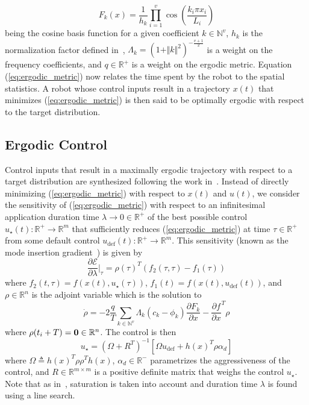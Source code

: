 \documentclass[conference]{IEEEtran}
\begin{document}
\begin{equation*}
F_k(x) = \frac{1}{h_k}\prod_{i=1}^v \cos \left( \frac{k_i \pi x_i}{L_i} \right)
\end{equation*}
being the cosine basis function for a given coefficient $k \in \mathbb{N}^v$,  $h_k$ is the normalization factor defined in~\cite{mathew2011metrics}, $\Lambda_k = (1 + \Vert k \Vert^2)^{-\frac{v+1}{2}}$ is a weight on the frequency coefficients, and $q\in \mathbb{R}^+$ is a weight on the ergodic metric.
Equation (\ref{eq:ergodic_metric}) now relates the time spent by the robot to the spatial statistics.
A robot whose control inputs result in a trajectory $x(t)$ that minimizes (\ref{eq:ergodic_metric}) is then said to be optimally ergodic with respect to the target distribution.

\subsection{Ergodic Control}

Control inputs that result in a maximally ergodic trajectory with respect to a target distribution are synthesized following the work in~\cite{mavrommati2017eSAC}.
Instead of directly minimizing (\ref{eq:ergodic_metric}) with respect to $x(t)$ and $u(t)$, we consider the sensitivity of (\ref{eq:ergodic_metric}) with respect to an infinitesimal application duration time $\lambda \to 0 \in \mathbb{R}^+$ of the best possible control $u_\star(t) : \mathbb{R}^+ \to \mathbb{R}^m$ that sufficiently reduces (\ref{eq:ergodic_metric}) at time $\tau \in \mathbb{R}^+$ from some default control $u_\text{def}(t) : \mathbb{R}^+ \to \mathbb{R}^m$.
This sensitivity (known as the mode insertion gradient~\cite{vasudevan2013consistent, axelsson2008gradient, egerstedt2006transition, caldwell2016projection}) is given by
\begin{equation*}
\frac{\partial \mathcal{E}}{\partial \lambda} \Big \vert_\tau = \rho(\tau)^T (f_2(\tau, \tau) - f_1(\tau))
\end{equation*}
where $f_2(t, \tau) = f(x(t), u_\star(\tau))$, $f_1(t) = f(x(t), u_\text{def}(t))$, and $\rho \in \mathbb{R}^n$ is the adjoint variable which is the solution to
\begin{equation*}
\dot{\rho} = - 2 \frac{q}{T} \sum_{k \in \mathbb{N}^v} \Lambda_k (c_k - \phi_k) \frac{\partial F_k}{\partial x} - \frac{\partial f}{\partial x}^T \rho
\end{equation*}
where $\rho(t_i + T) = \bold{0} \in \mathbb{R}^n$.
The control is then
\begin{equation}
u_\star = (\Omega + R^T)^{-1} \left[ \Omega u_\text{def} + h(x)^T \rho \alpha_d \right]
\end{equation} 
where $\Omega \triangleq h(x)^T \rho \rho^T h(x)$, $\alpha_d \in \mathbb{R}^-$ parametrizes the aggressiveness of the control, and $R \in \mathbb{R}^{m \times m}$ is a positive definite matrix that weighs the control $u_\star$.
Note that as in~\cite{mavrommati2017eSAC}, saturation is taken into account and duration time $\lambda$ is found using a line search. 
\end{document}

